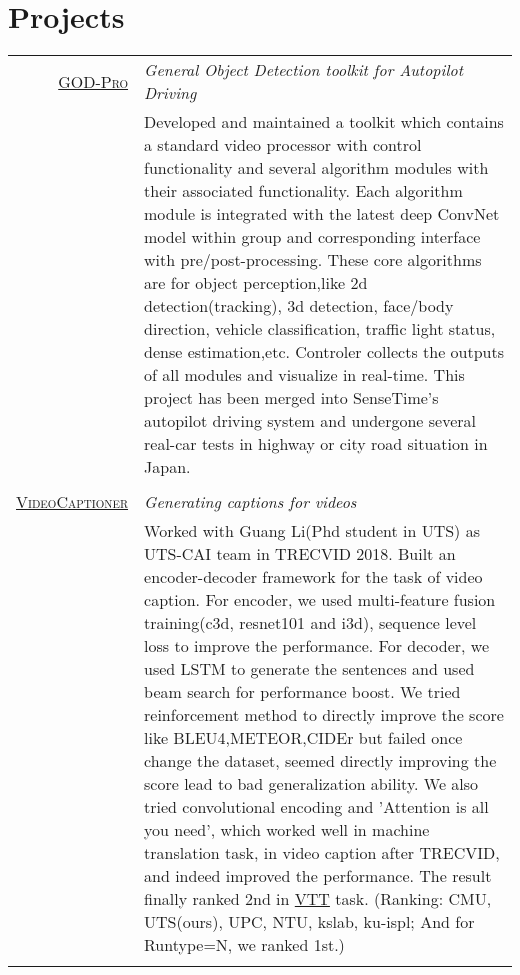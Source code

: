 \documentclass[a4paper,10pt]{article}
\begin{document}
\section{Projects}
\begin{tabular}{r|p{12cm}}	
 \textsc{\href{}{GOD-Pro}} & \emph{General Object Detection toolkit for Autopilot Driving}\\
& \footnotesize{Developed and maintained a toolkit which contains a standard video processor with control functionality and several algorithm modules with their associated functionality. Each algorithm module is integrated with the latest deep ConvNet model within group and corresponding interface with pre/post-processing. These core algorithms are for object perception,like 2d detection(tracking), 3d detection, face/body direction, vehicle classification, traffic light status, dense estimation,etc. Controler collects the outputs of all modules and visualize in real-time. This project has been merged into SenseTime’s autopilot driving system and undergone several real-car tests in highway or city road situation in Japan.}\\\multicolumn{2}{c}{}
\\

 \textsc{\href{}{VideoCaptioner}} & \emph{Generating captions for videos}\\
& \footnotesize{Worked with Guang Li(Phd student in UTS) as UTS-CAI team in TRECVID 2018. Built an encoder-decoder framework for the task of video caption. For encoder, we used multi-feature fusion training(c3d, resnet101 and i3d), sequence level loss to improve the performance. For decoder, we used LSTM to generate the sentences and used beam search for performance boost. We tried reinforcement method to directly improve the score like BLEU4,METEOR,CIDEr but failed once change the dataset, seemed directly improving the score lead to bad generalization ability. We also tried convolutional encoding and 'Attention is all you need', which worked well in machine translation task, in video caption after TRECVID, and indeed improved the performance.
The result finally ranked 2nd in \href{https://www-nlpir.nist.gov/projects/tv2018/Tasks/vtt/}{VTT} task.
(Ranking: CMU, UTS(ours), UPC, NTU, kslab, ku-ispl; And for Runtype=N, we ranked 1st.)}\\\multicolumn{2}{c}{}
\\
\end{tabular}
\end{document}

